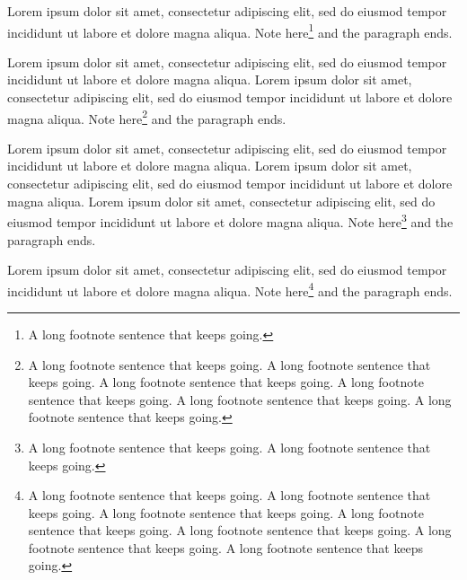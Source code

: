 \documentclass{article}
\begin{document}
Lorem ipsum dolor sit amet, consectetur adipiscing elit, sed do eiusmod tempor incididunt ut labore et dolore magna aliqua. Note here\footnote{A long footnote sentence that keeps going. } and the paragraph ends.

Lorem ipsum dolor sit amet, consectetur adipiscing elit, sed do eiusmod tempor incididunt ut labore et dolore magna aliqua. Lorem ipsum dolor sit amet, consectetur adipiscing elit, sed do eiusmod tempor incididunt ut labore et dolore magna aliqua. Note here\footnote{A long footnote sentence that keeps going. A long footnote sentence that keeps going. A long footnote sentence that keeps going. A long footnote sentence that keeps going. A long footnote sentence that keeps going. A long footnote sentence that keeps going. } and the paragraph ends.

Lorem ipsum dolor sit amet, consectetur adipiscing elit, sed do eiusmod tempor incididunt ut labore et dolore magna aliqua. Lorem ipsum dolor sit amet, consectetur adipiscing elit, sed do eiusmod tempor incididunt ut labore et dolore magna aliqua. Lorem ipsum dolor sit amet, consectetur adipiscing elit, sed do eiusmod tempor incididunt ut labore et dolore magna aliqua. Note here\footnote{A long footnote sentence that keeps going. A long footnote sentence that keeps going. } and the paragraph ends.

Lorem ipsum dolor sit amet, consectetur adipiscing elit, sed do eiusmod tempor incididunt ut labore et dolore magna aliqua. Note here\footnote{A long footnote sentence that keeps going. A long footnote sentence that keeps going. A long footnote sentence that keeps going. A long footnote sentence that keeps going. A long footnote sentence that keeps going. A long footnote sentence that keeps going. A long footnote sentence that keeps going. } and the paragraph ends.
\end{document}
